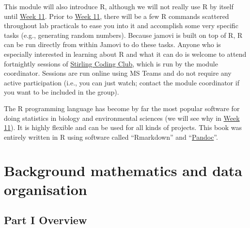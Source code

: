 \documentclass[
]{scrbook}
\begin{document}
This module will also introduce R, although we will not really use R by itself until \protect\hyperlink{Week_11}{Week 11}.
Prior to \protect\hyperlink{Week_11}{Week 11}, there will be a few R commands scattered throughout lab practicals to ease you into it and accomplish some very specific tasks (e.g., generating random numbers).
Because jamovi is built on top of R, R can be run directly from within Jamovi to do these tasks.
Anyone who is especially interested in learning about R and what it can do is welcome to attend fortnightly sessions of \href{https://stirlingcodingclub.github.io/studyGroup/}{Stirling Coding Club}, which is run by the module coordinator.
Sessions are run online using MS Teams and do not require any active participation (i.e., you can just watch; contact the module coordinator if you want to be included in the group).

The R programming language has become by far the most popular software for doing statistics in biology and environmental sciences (we will see why in \protect\hyperlink{Week_11}{Week 11}).
It is highly flexible and can be used for all kinds of projects.
This book was entirely written in R using software called ``Rmarkdown'' and ``\href{https://pandoc.org/}{Pandoc}''.

\hypertarget{part-background-mathematics-and-data-organisation}{%
\part{Background mathematics and data organisation}\label{part-background-mathematics-and-data-organisation}}

\hypertarget{Week1}{%
\chapter*{Part I Overview}\label{Week1}}
\end{document}
